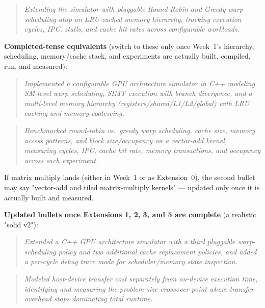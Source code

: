 \documentclass[11pt]{article}
\begin{document}
\begin{quote}
\itshape
Extending the simulator with pluggable Round-Robin and Greedy warp
scheduling atop an LRU-cached memory hierarchy, tracking execution
cycles, IPC, stalls, and cache hit rates across configurable workloads.
\end{quote}

\textbf{Completed-tense equivalents} (switch to these only once Week~1's
hierarchy, scheduling, memory/cache stack, and experiments are actually
built, compiled, run, and measured):

\begin{quote}
\itshape
Implemented a configurable GPU architecture simulator in C++ modeling
SM-level warp scheduling, SIMT execution with branch divergence, and a
multi-level memory hierarchy (registers/shared/L1/L2/global) with LRU
caching and memory coalescing.
\end{quote}

\begin{quote}
\itshape
Benchmarked round-robin vs.\ greedy warp scheduling, cache size, memory
access patterns, and block size/occupancy on a vector-add kernel,
measuring cycles, IPC, cache hit rate, memory transactions, and occupancy
across each experiment.
\end{quote}

If matrix multiply lands (either in Week~1 or as Extension~0), the second
bullet may say "vector-add and tiled matrix-multiply kernels" --- updated
only once it is actually built and measured.

\textbf{Updated bullets once Extensions 1, 2, 3, and 5 are complete}
(a realistic "solid v2"):

\begin{quote}
\itshape
Extended a C++ GPU architecture simulator with a third pluggable
warp-scheduling policy and two additional cache replacement policies, and
added a per-cycle debug trace mode for scheduler/memory state inspection.
\end{quote}

\begin{quote}
\itshape
Modeled host-device transfer cost separately from on-device execution
time, identifying and measuring the problem-size crossover point where
transfer overhead stops dominating total runtime.
\end{quote}

\begin{center}
\end{center}
\end{document}
